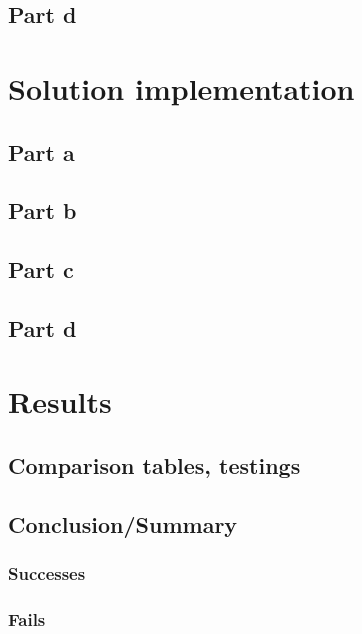 \documentclass[11pt,a4paper]{book}
\begin{document}
\section{Part d}
\blindtext
\blinditemize
\blindtext
\Blindtext



\chapter{Solution implementation}
\section{Part a}
\blindtext
\blinditemize
\blindtext
\Blindtext
\section{Part b}
\blindtext
\blinditemize
\blindtext
\Blindtext
\section{Part c}
\blindtext
\blinditemize
\blindtext
\Blindtext
\section{Part d}
\blindtext
\blinditemize
\blindtext
\Blindtext



\chapter{Results}
\section{Comparison tables, testings}
\blindtext
\blinditemize

\section{Conclusion/Summary}
\blindtext

\subsection*{Successes}
\blindtext

\subsection*{Fails}
\blindtext
\end{document}
